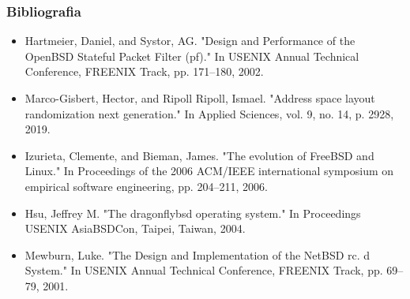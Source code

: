 \documentclass[9pt,xcolor=table]{beamer}
\begin{document}
\begin{frame}
  \frametitle{Bibliografia}
  \begin{itemize}
    \item Hartmeier, Daniel, and Systor, AG. "Design and Performance of the OpenBSD Stateful Packet Filter (pf)." In USENIX Annual Technical Conference, FREENIX Track, pp. 171--180, 2002.
    \item Marco-Gisbert, Hector, and Ripoll Ripoll, Ismael. "Address space layout randomization next generation." In Applied Sciences, vol. 9, no. 14, p. 2928, 2019.
    \item Izurieta, Clemente, and Bieman, James. "The evolution of FreeBSD and Linux." In Proceedings of the 2006 ACM/IEEE international symposium on empirical software engineering, pp. 204--211, 2006.
    \item Hsu, Jeffrey M. "The dragonflybsd operating system." In Proceedings USENIX AsiaBSDCon, Taipei, Taiwan, 2004.
    \item Mewburn, Luke. "The Design and Implementation of the NetBSD rc. d System." In USENIX Annual Technical Conference, FREENIX Track, pp. 69--79, 2001.
  \end{itemize}
\end{frame}
\end{document}
